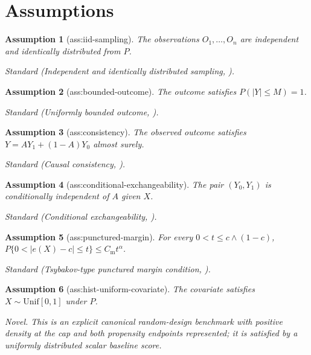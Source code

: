 \documentclass{article}
\newtheorem{assumption}{Assumption}
\begin{document}
\section{Assumptions}

\begin{assumption}[ass:iid-sampling]\label{ass:iid-sampling}
The observations \(O_1,\ldots,O_n\) are independent and identically distributed from \(P\).
\par\smallskip\noindent\emph{Standard} (Independent and identically distributed sampling, \cite{vanDerVaart1998}).
\end{assumption}

\begin{assumption}[ass:bounded-outcome]\label{ass:bounded-outcome}
The outcome satisfies \(P(|Y|\le M)=1\).
\par\smallskip\noindent\emph{Standard} (Uniformly bounded outcome, \cite{LuedtkeVanDerLaan2016}).
\end{assumption}

\begin{assumption}[ass:consistency]\label{ass:consistency}
The observed outcome satisfies \(Y=AY_1+(1-A)Y_0\) almost surely.
\par\smallskip\noindent\emph{Standard} (Causal consistency, \cite{ZhouOpacic2022}).
\end{assumption}

\begin{assumption}[ass:conditional-exchangeability]\label{ass:conditional-exchangeability}
The pair \((Y_0,Y_1)\) is conditionally independent of \(A\) given \(X\).
\par\smallskip\noindent\emph{Standard} (Conditional exchangeability, \cite{ZhouOpacic2022}).
\end{assumption}

\begin{assumption}[ass:punctured-margin]\label{ass:punctured-margin}
For every \(0<t\le c\wedge(1-c)\), \(P\{0<|e(X)-c|\le t\}\le C_{\mathrm m}t^\alpha\).
\par\smallskip\noindent\emph{Standard} (Tsybakov-type punctured margin condition, \cite{LevisEtAl2025}).
\end{assumption}

\begin{assumption}[ass:hist-uniform-covariate]\label{ass:hist-uniform-covariate}
The covariate satisfies \(X\sim\mathrm{Unif}[0,1]\) under \(P\).
\par\smallskip\noindent\emph{Novel.} This is an explicit canonical random-design benchmark with positive density at the cap and both propensity endpoints represented; it is satisfied by a uniformly distributed scalar baseline score.
\end{assumption}
\end{document}
